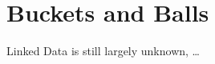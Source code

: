 
\setchapterpreamble[u]{\margintoc}
\chapter{Buckets and Balls}

Linked Data is still largely unknown, \dots


